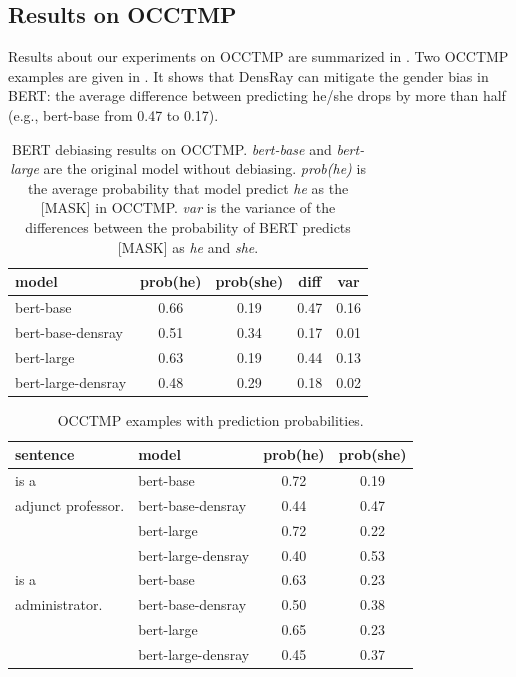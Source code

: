 \subsection{Results on OCCTMP}
Results about our experiments on OCCTMP are summarized in . Two OCCTMP examples are given in . It shows that DensRay can mitigate the gender bias in BERT: the average difference between predicting he/she drops by more than half (e.g., bert-base from 0.47 to 0.17).
\begin{table}[ht]
\centering
\footnotesize
\begin{tabular}{lcccc}
\hline
model & prob(he) & prob(she) & diff & var\\
\hline
bert-base & 0.66 & 0.19 & 0.47 & 0.16 \\
bert-base-densray & 0.51 & 0.34 & {0.17} & 0.01\\
\hline
bert-large  & 0.63 & 0.19 & 0.44 & 0.13 \\
bert-large-densray  & 0.48 & 0.29 & {0.18} & 0.02\\
\hline
\end{tabular}
\caption{
BERT debiasing results on OCCTMP. \textit{bert-base} and \textit{bert-large} are the original model without debiasing. \textit{prob(he)} is the average probability that model predict \textit{he} as the [MASK] in OCCTMP. \textit{var} is the variance of the differences between the probability of BERT predicts [MASK] as \textit{he} and \textit{she}.} 
\end{table}
\begin{table}[ht]
\centering
\footnotesize
\begin{tabular}{llcc}
\hline
sentence & model & prob(he) & prob(she)\\
\hline
[MASK] is a & 
\scriptsize bert-base 
& 0.72 & 0.19\\
adjunct professor. & 
\scriptsize bert-base-densray 
& 0.44 & 0.47\\
&\scriptsize bert-large
& 0.72 & 0.22\\
&\scriptsize bert-large-densray& 0.40 & 0.53\\
\hline
[MASK] is a 
&\scriptsize bert-base 
& 0.63 & 0.23\\
administrator.  
&\scriptsize bert-base-densray 
& 0.50 & 0.38\\
&\scriptsize bert-large & 0.65 & 0.23\\
&\scriptsize bert-large-densray & 0.45 & 0.37\\
\hline
\end{tabular}
\caption{
OCCTMP examples with prediction probabilities.}
\end{table}
